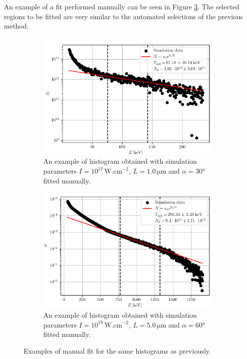 An example of a fit performed manually can be seen in Figure \ref{fig:manual-fit-example}. The selected regions to be fitted are very similar to the automated selections of the previous method. 
\begin{figure}[ht]
	\centering
	\begin{subfigure}{0.49\textwidth}
		\centering
		\includegraphics[width=\textwidth]{figures/hist_1e17_100_30_manual}
		\caption{An example of histogram obtained with simulation parameters $I=10^{17}\,\mathrm{W.cm}^{-2}$, $L=1.0\,\mathrm{\mu m}$ and $\alpha = 30$° fitted manually.}
		\label{fig:manual-ex1-good}
	\end{subfigure}
	\hfill
	\begin{subfigure}{0.49\textwidth}
		\centering
		\includegraphics[width=\textwidth]{figures/hist_1e19_500_60_manual}
		\caption{An example of histogram obtained with simulation parameters $I=10^{19}\,\mathrm{W.cm}^{-2}$, $L=5.0\,\mathrm{\mu m}$ and $\alpha = 60$° fitted manually.}
		\label{fig:manual-ex2-good}
	\end{subfigure}
	\caption{Examples of manual fit for the same histograms as previously.}
	\label{fig:manual-fit-example}
\end{figure}


